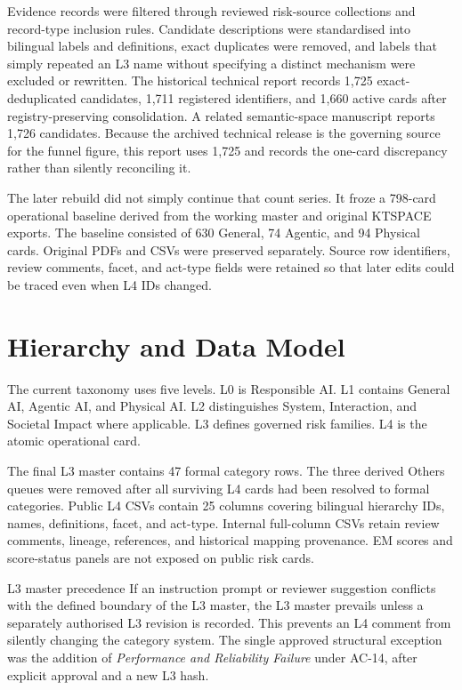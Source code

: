 \documentclass[10pt,a4paper]{article}
\begin{document}
Evidence records were filtered through reviewed risk-source collections and record-type inclusion rules. Candidate descriptions were standardised into bilingual labels and definitions, exact duplicates were removed, and labels that simply repeated an L3 name without specifying a distinct mechanism were excluded or rewritten. The historical technical report records 1,725 exact-deduplicated candidates, 1,711 registered identifiers, and 1,660 active cards after registry-preserving consolidation. A related semantic-space manuscript reports 1,726 candidates. Because the archived technical release is the governing source for the funnel figure, this report uses 1,725 and records the one-card discrepancy rather than silently reconciling it.

The later rebuild did not simply continue that count series. It froze a 798-card operational baseline derived from the working master and original KTSPACE exports. The baseline consisted of 630 General, 74 Agentic, and 94 Physical cards. Original PDFs and CSVs were preserved separately. Source row identifiers, review comments, facet, and act-type fields were retained so that later edits could be traced even when L4 IDs changed.

\section{Hierarchy and Data Model}

The current taxonomy uses five levels. L0 is Responsible AI. L1 contains General AI, Agentic AI, and Physical AI. L2 distinguishes System, Interaction, and Societal Impact where applicable. L3 defines governed risk families. L4 is the atomic operational card.

The final L3 master contains 47 formal category rows. The three derived Others queues were removed after all surviving L4 cards had been resolved to formal categories. Public L4 CSVs contain 25 columns covering bilingual hierarchy IDs, names, definitions, facet, and act-type. Internal full-column CSVs retain review comments, lineage, references, and historical mapping provenance. EM scores and score-status panels are not exposed on public risk cards.

\begin{decisionbox}{L3 master precedence}
If an instruction prompt or reviewer suggestion conflicts with the defined boundary of the L3 master, the L3 master prevails unless a separately authorised L3 revision is recorded. This prevents an L4 comment from silently changing the category system. The single approved structural exception was the addition of \emph{Performance and Reliability Failure} under AC-14, after explicit approval and a new L3 hash.
\end{decisionbox}
\end{document}
